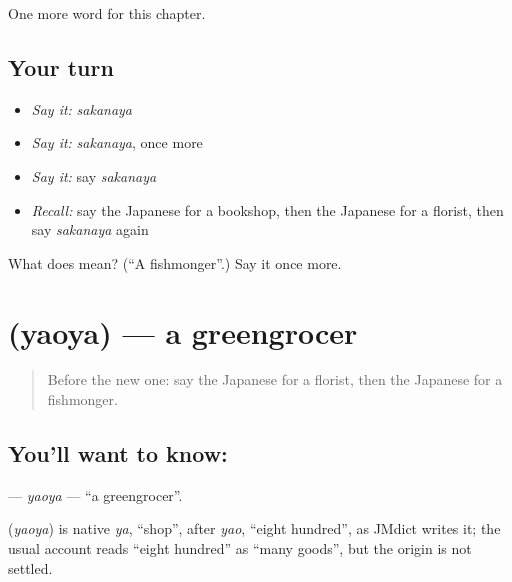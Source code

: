 \begin{grammarlens}[title={What you've built}]
One more word for this chapter.
\end{grammarlens}

\subsection*{Your turn}
\begin{itemize}
\raggedright
  \item \emph{Say it:} \emph{sakanaya}
  \item \emph{Say it:} \emph{sakanaya}, once more
  \item \emph{Say it:} say \emph{sakanaya}
  \item \emph{Recall:} say the Japanese for a bookshop, then the Japanese for a florist, then say \emph{sakanaya} again
\end{itemize}

\begin{tcolorbox}[breakable,colback=teal!4,colframe=teal!35!black,title={Before you move on}]
What does  mean? (\textquotedblleft{}A fishmonger\textquotedblright{}.) Say it once more.
\end{tcolorbox}
\section[\texorpdfstring{\ja{やおや} (yaoya)}{やおや (yaoya)}]{ (yaoya) — a greengrocer}

\label{lesson:JA-C119-yaoya}



\begin{quote}
Before the new one: say the Japanese for a florist, then the Japanese for a fishmonger.
\end{quote}

\subsection*{You'll want to know: }
\textbf{} — \emph{yaoya} — \textquotedblleft{}a greengrocer\textquotedblright{}.

\begin{cousinweb}
\textbf{} (\emph{yaoya}) is native \emph{ya}, \textquotedblleft{}shop\textquotedblright{}, after \emph{yao}, \textquotedblleft{}eight hundred\textquotedblright{}, as JMdict writes it; the usual account reads \textquotedblleft{}eight hundred\textquotedblright{} as \textquotedblleft{}many goods\textquotedblright{}, but the origin is not settled.
\end{cousinweb}

